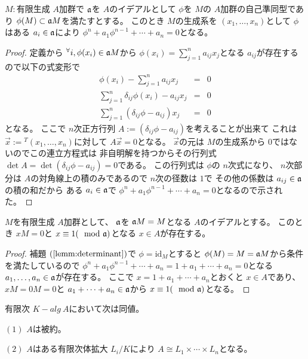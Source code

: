 \documentclass[../master_galois_theory]{subfiles}
\begin{document}
\begin{lemm} \label{lemm:determinant}
  $M:$有限生成 $A$加群で $\mathfrak{a}$を $A$のイデアルとして
  $\phi$を $M$の $A$加群の自己準同型であり $\phi(M) \subset \mathfrak{a} M$を満たすとする。
  このとき $M$の生成系を $(x_1 , \dots , x_n)$として
  $\phi$はある $a_i \in \mathfrak{a}$により
  $\phi^n + a_1 \phi^{n-1} + \cdots + a_n = 0$となる。
\end{lemm}

\begin{proof}
  定義から ${}^\forall i , \phi(x_i) \in \mathfrak{a} M$から
  $\phi(x_i) = \sum_{j = 1}^n a_{ij} x_j$となる $a_{ij}$が存在するので以下の式変形で
  \begin{eqnarray*}
    \phi(x_i) - \sum_{j = 1}^n a_{ij} x_j & = & 0 \\
    \sum_{j = 1}^n \delta_{ij} \phi(x_i) - a_{ij} x_j & = & 0 \\
    \sum_{j = 1}^n (\delta_{ij} \phi - a_{ij}) x_j & = & 0
  \end{eqnarray*}
  となる。
  ここで $n$次正方行列 $A := (\delta_{ij} \phi - a_{ij})$を考えることが出来て
  これは $\vec{x} := {}^T(x_1 , \dots , x_n)$に対して
  $A \vec{x} = 0$となる。
  $\vec{x}$の元は $M$の生成系から $0$ではないのでこの連立方程式は
  非自明解を持つからその行列式
  $\det A = \det (\delta_{ij} \phi - a_{ij}) = 0$である。
  この行列式は $\phi$の $n$次式になり、
  $n$次部分は $A$の対角線上の積のみであるので $n$次の径数は $1$で
  その他の係数は $a_{ij} \in \mathfrak{a}$の積の和だから
  ある $a_i \in \mathfrak{a}$で
  $\phi^n + a_1 \phi^{n-1} + \cdots + a_n = 0$となるので示された。
\end{proof}

\begin{corl} \label{corl:determinant}
  $M$を有限生成 $A$加群として、
  $\mathfrak{a}$を $\mathfrak{a} M = M$となる $A$のイデアルとする。
  このとき $x M = 0$と $x \equiv 1 (\mod {\mathfrak{a}})$となる $x \in A$が存在する。
\end{corl}

\begin{proof}
  補題 $(\mathrm{\ref{lemm:determinant}})$で $\phi = \mathrm{id}_M$とすると
  $\phi(M) = M = \mathfrak{a} M$から条件を満たしているので
  $\phi^n + a_1 \phi^{n-1} + \cdots + a_n = 1 + a_1 + \cdots + a_n = 0$となる
  $a_1 , \dots , a_n \in \mathfrak{a}$が存在する。
  ここで $x = 1 + a_1 + \cdots + a_n$とおくと $x \in A$であり、
  $x M = 0 M = 0$と
  $a_1 + \cdots + a_n \in \mathfrak{a}$から $x \equiv 1 (\mod {\mathfrak{a}})$となる。
\end{proof}

\begin{prop}
  有限次 $K-alg \  A$において次は同値。

  $(1)$
  $A$は被約。

  $(2)$
  $A$はある有限次体拡大 $L_i/K$により
  $A \cong L_1 \times \cdots \times L_n$となる。
\end{prop}
\end{document}
